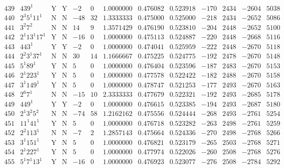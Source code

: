 \documentclass[11pt,reqno,a4letter]{article}
\numberwithin{equation}{section}
\numberwithin{figure}{section}
\numberwithin{table}{section}
\theoremstyle{plain}
\numberwithin{theorem}{section}
\theoremstyle{definition}
\begin{document}
\begin{table}[ht]
\begin{equation*}
{\begin{array}{cc|cc|ccc|cc|cccc}
 439 & 439^1 & \text{Y} & \text{Y} & -2 & 0 & 1.0000000 & 0.476082 & 0.523918 & -170 & 2434 & -2604 & 5038 \\
 440 & 2^3 5^1 11^1 & \text{N} & \text{N} & -48 & 32 & 1.3333333 & 0.475000 & 0.525000 & -218 & 2434 & -2652 & 5086 \\
 441 & 3^2 7^2 & \text{N} & \text{N} & 14 & 9 & 1.3571429 & 0.476190 & 0.523810 & -204 & 2448 & -2652 & 5100 \\
 442 & 2^1 13^1 17^1 & \text{Y} & \text{N} & -16 & 0 & 1.0000000 & 0.475113 & 0.524887 & -220 & 2448 & -2668 & 5116 \\
 443 & 443^1 & \text{Y} & \text{Y} & -2 & 0 & 1.0000000 & 0.474041 & 0.525959 & -222 & 2448 & -2670 & 5118 \\
 444 & 2^2 3^1 37^1 & \text{N} & \text{N} & 30 & 14 & 1.1666667 & 0.475225 & 0.524775 & -192 & 2478 & -2670 & 5148 \\
 445 & 5^1 89^1 & \text{Y} & \text{N} & 5 & 0 & 1.0000000 & 0.476404 & 0.523596 & -187 & 2483 & -2670 & 5153 \\
 446 & 2^1 223^1 & \text{Y} & \text{N} & 5 & 0 & 1.0000000 & 0.477578 & 0.522422 & -182 & 2488 & -2670 & 5158 \\
 447 & 3^1 149^1 & \text{Y} & \text{N} & 5 & 0 & 1.0000000 & 0.478747 & 0.521253 & -177 & 2493 & -2670 & 5163 \\
 448 & 2^6 7^1 & \text{N} & \text{N} & -15 & 10 & 2.3333333 & 0.477679 & 0.522321 & -192 & 2493 & -2685 & 5178 \\
 449 & 449^1 & \text{Y} & \text{Y} & -2 & 0 & 1.0000000 & 0.476615 & 0.523385 & -194 & 2493 & -2687 & 5180 \\
 450 & 2^1 3^2 5^2 & \text{N} & \text{N} & -74 & 58 & 1.2162162 & 0.475556 & 0.524444 & -268 & 2493 & -2761 & 5254 \\
 451 & 11^1 41^1 & \text{Y} & \text{N} & 5 & 0 & 1.0000000 & 0.476718 & 0.523282 & -263 & 2498 & -2761 & 5259 \\
 452 & 2^2 113^1 & \text{N} & \text{N} & -7 & 2 & 1.2857143 & 0.475664 & 0.524336 & -270 & 2498 & -2768 & 5266 \\
 453 & 3^1 151^1 & \text{Y} & \text{N} & 5 & 0 & 1.0000000 & 0.476821 & 0.523179 & -265 & 2503 & -2768 & 5271 \\
 454 & 2^1 227^1 & \text{Y} & \text{N} & 5 & 0 & 1.0000000 & 0.477974 & 0.522026 & -260 & 2508 & -2768 & 5276 \\
 455 & 5^1 7^1 13^1 & \text{Y} & \text{N} & -16 & 0 & 1.0000000 & 0.476923 & 0.523077 & -276 & 2508 & -2784 & 5292 \\

\end{array}}
\end{equation*}
\end{table}
\end{document}
